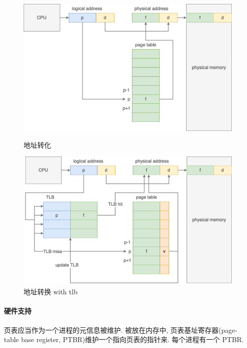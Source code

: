 
\begin{figure}[H]
    \centering
    \begin{minipage}{0.48\linewidth}
        \centering
        \includegraphics[width=\linewidth]{pic/OS-CheatSheet/page table.png}
        \caption{地址转化}
    \end{minipage}
    \begin{minipage}{0.48\linewidth}
        \centering
    \includegraphics[width=\linewidth]{pic/OS-CheatSheet/地址转换 with tlb}
    \caption{地址转换 with tlb}
    \end{minipage}
\end{figure}


\paragraph{硬件支持}页表应当作为一个进程的元信息被维护. 被放在内存中, 页表基址寄存器(page-table base register, PTBR)维护一个指向页表的指针来. 每个进程有一个 PTBR. 

